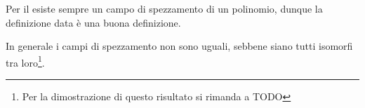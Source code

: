 \begin{remark*}
    Per il  esiste sempre un campo di spezzamento
    di un polinomio, dunque la definizione data è una buona definizione.
\end{remark*}

\begin{remark*}
    In generale i campi di spezzamento non sono uguali, sebbene siano tutti
    isomorfi tra loro\footnote{Per la dimostrazione di questo risultato
        si rimanda a TODO}.
\end{remark*}